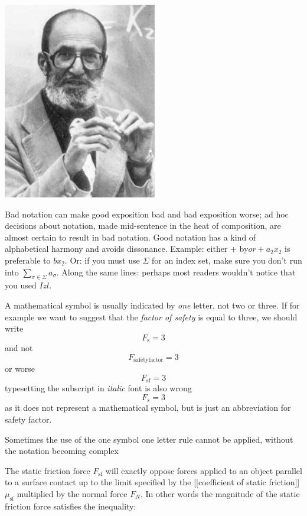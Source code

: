 {\begin{marginfigure}
\includegraphics[scale=.8]{./graphics/halmos}
\end{marginfigure}


Bad notation can make good exposition bad and bad exposition worse; ad hoc decisions about notation, made mid-sentence in the heat of composition, are almost certain to result in bad notation. Good notation has a kind of alphabetical harmony and avoids dissonance. Example: either + by$ or +a_2x_2$ is preferable to $bx_2$. Or: if you must use $\Sigma$ for an index set, make sure you don't run into $\sum_{\sigma \in \Sigma}a_\sigma$. Along the same lines: perhaps most readers wouldn't notice that you used $Izl$.


A mathematical symbol is usually indicated by \emph{one} letter, not two or three. If for example we want to suggest that the \textit{factor of safety} is equal to three, we should write
\[F_{\mathrm{s}}=3\]
and not
\[F_{\mathrm{safetyfactor}}=3\]
or worse
\[F_{\mathrm{sf}}=3\]
typesetting the subscript in \textit{italic} font is also wrong
\[F_{s}=3\]
as it does not represent a mathematical symbol, but is just an abbreviation for safety factor.

Sometimes the use of the one symbol one letter rule cannot be applied, without the notation becoming complex
\medskip

{
\narrower\narrower
The static friction force \(F_{\mathrm{sf}}\) will exactly oppose forces applied to an object parallel to a surface contact up to the limit specified by the [[coefficient of static friction]] \(\mu_{\mathrm{sf}}\) multiplied by the normal force \(F_N\). In other words the magnitude of the static friction force satisfies the inequality:

}}
